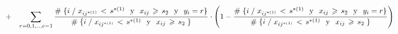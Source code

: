 \documentclass[
  11pt,
  a4paper,
]{article}
\begin{document}
\begin{gather*}
\hspace{-1.5 cm} +  \hspace{0.3cm}         \sum_{r=0,1,..,c-1}^{}  \dfrac{\# \hspace{0.1 cm}\lbrace i \hspace{0.1 cm}/\hspace{0.1 cm}  x_{ij^{*(1)}} \hspace{0.05cm}   < \hspace{0.05cm} s^{*(1)} \hspace{0.25 cm}\text{y}\hspace{0.25 cm} x_{ij} \hspace{0.05cm}   \geqslant \hspace{0.05cm} s_2 \hspace{0.25 cm}\text{y}\hspace{0.25 cm} y_i = r \rbrace}{\# \hspace{0.1 cm}\lbrace i \hspace{0.1 cm} / \hspace{0.1 cm}  x_{ij^{*(1)}} \hspace{0.05cm}   < \hspace{0.05cm} s^{*(1)} \hspace{0.25 cm}\text{y}\hspace{0.25 cm} x_{ij} \hspace{0.05cm}   \geqslant \hspace{0.05cm} s_2  \hspace{0.1 cm} \rbrace }  \cdot \left(   1 - \dfrac{\# \hspace{0.1 cm}\lbrace i \hspace{0.1 cm}/\hspace{0.1 cm}  x_{ij^{*(1)}} \hspace{0.05cm}   < \hspace{0.05cm} s^{*(1)} \hspace{0.25 cm}\text{y}\hspace{0.25 cm} x_{ij} \hspace{0.05cm}   \geqslant \hspace{0.05cm} s_2 \hspace{0.25 cm}\text{y}\hspace{0.25 cm} y_i = r \rbrace}{\# \hspace{0.1 cm}\lbrace i \hspace{0.1 cm} / \hspace{0.1 cm}  x_{ij^{*(1)}} \hspace{0.05cm}   < \hspace{0.05cm} s^{*(1)} \hspace{0.25 cm}\text{y}\hspace{0.25 cm} x_{ij} \hspace{0.05cm}   \geqslant \hspace{0.05cm} s_2  \hspace{0.1 cm} \rbrace }  \right)  \\ \\

\end{gather*}
\end{document}
